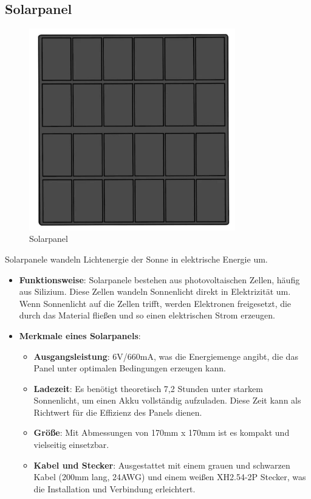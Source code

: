 \documentclass{vorlage-design-main}
\begin{document}
\hypertarget{solarpanel}{%
\subsection{Solarpanel}\label{solarpanel}}

\begin{figure}
\centering
\includegraphics[width=0.8\textwidth]{images/solar_panel.pdf}
\floatnotes{}
\caption{Solarpanel}
\end{figure}

Solarpanele wandeln Lichtenergie der Sonne in elektrische Energie um.

\begin{itemize}
\item
  \textbf{Funktionsweise}: Solarpanele bestehen aus photovoltaischen
  Zellen, häufig aus Silizium. Diese Zellen wandeln Sonnenlicht direkt
  in Elektrizität um. Wenn Sonnenlicht auf die Zellen trifft, werden
  Elektronen freigesetzt, die durch das Material fließen und so einen
  elektrischen Strom erzeugen.
\item
  \textbf{Merkmale eines Solarpanels}:

  \begin{itemize}
  
  \item
    \textbf{Ausgangsleistung}: 6V/660mA, was die Energiemenge angibt,
    die das Panel unter optimalen Bedingungen erzeugen kann.
  \item
    \textbf{Ladezeit}: Es benötigt theoretisch 7,2 Stunden unter starkem
    Sonnenlicht, um einen Akku vollständig aufzuladen. Diese Zeit kann
    als Richtwert für die Effizienz des Panels dienen.
  \item
    \textbf{Größe}: Mit Abmessungen von 170mm x 170mm ist es kompakt und
    vielseitig einsetzbar.
  \item
    \textbf{Kabel und Stecker}: Ausgestattet mit einem grauen und
    schwarzen Kabel (200mm lang, 24AWG) und einem weißen XH2.54-2P
    Stecker, was die Installation und Verbindung erleichtert.
  \end{itemize}
\end{itemize}
\end{document}
